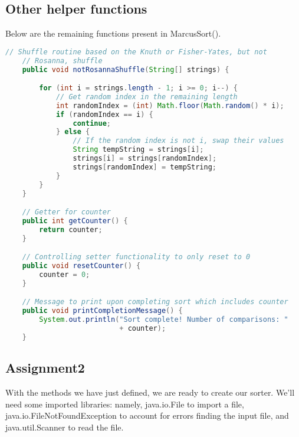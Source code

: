 \documentclass[letterpaper, 10pt]{article}
\begin{document}
\subsection{Other helper functions}

\hspace{1.0em}Below are the remaining functions present in MarcusSort().

\vspace{2.0em}

\begin{lstlisting}[language=Java, firstnumber=220]
    // Shuffle routine based on the Knuth or Fisher-Yates, but not
    // Rosanna, shuffle
    public void notRosannaShuffle(String[] strings) {

        for (int i = strings.length - 1; i >= 0; i--) {
            // Get random index in the remaining length
            int randomIndex = (int) Math.floor(Math.random() * i);
            if (randomIndex == i) {
                continue;
            } else {
                // If the random index is not i, swap their values
                String tempString = strings[i];
                strings[i] = strings[randomIndex];
                strings[randomIndex] = tempString;
            }
        }
    }

    // Getter for counter
    public int getCounter() {
        return counter;
    }

    // Controlling setter functionality to only reset to 0
    public void resetCounter() {
        counter = 0; 
    }

    // Message to print upon completing sort which includes counter
    public void printCompletionMessage() {
        System.out.println("Sort complete! Number of comparisons: "
                           + counter);
    }
\end{lstlisting}

\subsection{Assignment2}

\hspace{1.0em}With the methods we have just defined, we are ready to create our sorter. We'll need some imported libraries: namely, java.io.File to import a file, java.io.FileNotFoundException to account for errors finding the input file, and java.util.Scanner to read the file.

\vspace{2.0em}
\end{document}
